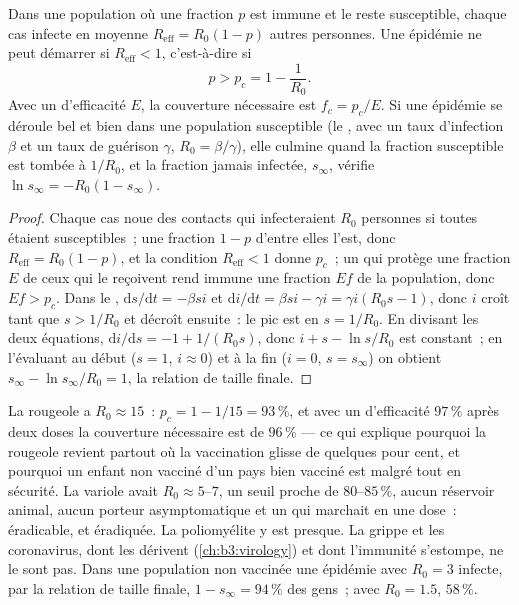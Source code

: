 \begin{theorem}\label{thm:b3:adaptive-immunity:herd}
Dans une population où une fraction $p$ est immune et le reste
susceptible, chaque cas infecte en moyenne $R_{\text{eff}} = R_{0}(1 -
p)$ autres personnes. Une épidémie ne peut démarrer si
$R_{\text{eff}} < 1$, c'est-à-dire si
\[
p > p_{c} = 1 - \frac{1}{R_{0}} .
\]
Avec un  d'efficacité $E$, la couverture nécessaire est $f_{c} = p_{c}/E$.
Si une épidémie se déroule bel et bien dans une population susceptible
(le , avec un taux d'infection $\beta$ et un taux de guérison
$\gamma$, $R_{0} =
\beta/\gamma$), elle culmine quand la fraction susceptible est tombée à
$1/R_{0}$, et la fraction jamais infectée, $s_{\infty}$, vérifie
$\ln s_{\infty} = -R_{0}(1 - s_{\infty})$.
\end{theorem}
\begin{proof}
Chaque cas noue des contacts qui infecteraient $R_{0}$ personnes si
toutes étaient susceptibles~; une fraction $1 - p$ d'entre elles l'est,
donc $R_{\text{eff}} =
R_{0}(1-p)$, et la condition $R_{\text{eff}} < 1$ donne $p_{c}$~; un
 qui protège une fraction $E$ de ceux qui le reçoivent rend immune
une fraction $Ef$ de la population, donc $Ef > p_{c}$. Dans le , $\mathrm{d}s/\mathrm{d}t = -\beta si$ et $\mathrm{d}i/\mathrm{d}t =
\beta si - \gamma i = \gamma i(R_{0}s - 1)$, donc $i$ croît tant que $s >
1/R_{0}$ et décroît ensuite~: le pic est en $s = 1/R_{0}$. En divisant
les deux équations, $\mathrm{d}i/\mathrm{d}s = -1 + 1/(R_{0}s)$, donc $i + s -
\ln s/R_{0}$ est constant~; en l'évaluant au début ($s = 1$, $i
\approx 0$) et à la fin ($i = 0$, $s = s_{\infty}$) on obtient
$s_{\infty} - \ln s_{\infty}/R_{0} = 1$, la relation de taille finale.
\end{proof}

\begin{example}\label{ex:b3:adaptive-immunity:measles}
La rougeole a $R_{0} \approx 15$~: $p_{c} = 1 - 1/15 = 93\,\%$, et avec
un  d'efficacité $97\,\%$ après deux doses la couverture
nécessaire est de $96\,\%$ --- ce qui explique pourquoi la rougeole
revient partout où la vaccination glisse de quelques pour cent, et
pourquoi un enfant non vacciné d'un pays bien vacciné est malgré tout en
sécurité. La variole avait $R_{0} \approx 5$--$7$, un seuil proche de
$80$--$85\,\%$, aucun réservoir animal, aucun porteur asymptomatique et
un  qui marchait en une dose~: éradicable, et éradiquée. La
poliomyélite y est presque. La grippe et les coronavirus, dont les
 dérivent (\cref{ch:b3:virology}) et dont l'immunité s'estompe,
ne le sont pas. Dans une population non vaccinée une épidémie avec
$R_{0} = 3$ infecte, par la relation de taille finale,
$1 - s_{\infty} = 94\,\%$ des gens~; avec $R_{0} = 1.5$, $58\,\%$.
\end{example}

